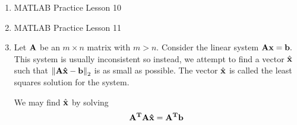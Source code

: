 \documentclass{article}
\begin{document}
\begin{enumerate}
	\item MATLAB Practice Lesson 10

	\item MATLAB Practice Lesson 11

	\item Let $\bf A$ be an $m\times n$ matrix with $m>n.$ Consider the linear system $\bf{Ax} = \bf b.$ This system is usually inconsistent so instead, we attempt to find a vector $\hat{\bf x}$ such that $\left\lVert \bf{A\hat{x}}-\bf{b} \right\rVert_2$ is as small as possible. The vector $\hat{\bf x}$ is called the least squares solution for the system.
		\begin{itemize}
				\ii We may find $\hat{\bf {x}}$ by solving 
				\begin{align*}
					\bf{A}^T \bf{A\hat{x}} = \bf{A}^T\bf{b}
				\end{align*}


\end{itemize}
\end{enumerate}
\end{document}
